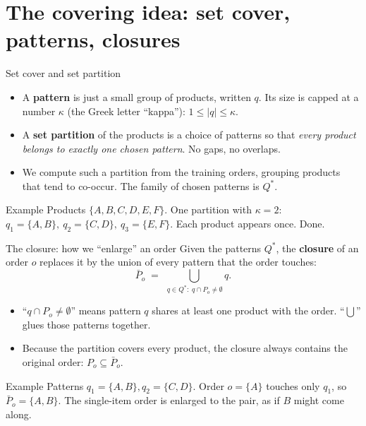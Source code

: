 \documentclass[11pt,aspectratio=169]{beamer}
\newcommand{\term}[1]{\textcolor{blue!60!black}{\textbf{#1}}}
\begin{document}
\section{The covering idea: set cover, patterns, closures}

\begin{frame}{Set cover and set partition}
  \begin{itemize}
    \item A \term{pattern} is just a small group of products, written $q$. Its size is capped at a number $\kappa$ (the Greek letter ``kappa''): $1 \le |q| \le \kappa$.
    \item A \term{set partition} of the products is a choice of patterns so that \emph{every product belongs to exactly one chosen pattern}. No gaps, no overlaps.
    \item We compute such a partition from the training orders, grouping products that tend to co-occur. The family of chosen patterns is $Q^*$.
  \end{itemize}
  \begin{exampleblock}{Example}
  Products $\{A,B,C,D,E,F\}$. One partition with $\kappa=2$:
  $q_1=\{A,B\},\ q_2=\{C,D\},\ q_3=\{E,F\}$. Each product appears once. Done.
  \end{exampleblock}
\end{frame}

\begin{frame}{The closure: how we ``enlarge'' an order}
  Given the patterns $Q^*$, the \term{closure} of an order $o$ replaces it by the union of every pattern that the order touches:
  \[
  \bar P_o \;=\; \bigcup_{\,q\in Q^*:\; q\cap P_o \neq \emptyset} q .
  \]
  \begin{itemize}
    \item ``$q\cap P_o\neq\emptyset$'' means pattern $q$ shares at least one product with the order. ``$\bigcup$'' glues those patterns together.
    \item Because the partition covers every product, the closure always contains the original order: $P_o \subseteq \bar P_o$.
  \end{itemize}
  \begin{exampleblock}{Example}
  Patterns $q_1=\{A,B\},q_2=\{C,D\}$. Order $o=\{A\}$ touches only $q_1$, so $\bar P_o=\{A,B\}$. The single-item order is enlarged to the pair, as if $B$ might come along.
  \end{exampleblock}
\end{frame}
\end{document}
